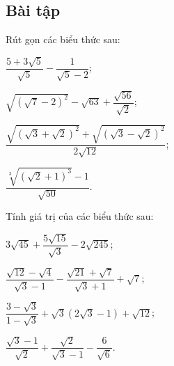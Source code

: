 \begin{exercises}
    \subsection{Bài tập}

    \begin{questions}[resume=SGK]
        \item Rút gọn các biểu thức sau:
        \begin{questions}
            \item $\dfrac{5+3\sqrt{5}}{\sqrt{5}}-\dfrac{1}{\sqrt{5}-2}$;

            \answerline
            \answerline

            \item $\sqrt{(\sqrt{7}-2)^2}-\sqrt{63}+\dfrac{\sqrt{56}}{\sqrt{2}}$;

            \answerline
            \answerline

            \item $\dfrac{\sqrt{(\sqrt{3}+\sqrt{2})^2}+\sqrt{(\sqrt{3}-\sqrt{2})^2}}{2\sqrt{12}}$;

            \answerline
            \answerline

            \item $\dfrac{\sqrt[3]{(\sqrt{2}+1)^3}-1}{\sqrt{50}}$.

            \answerline
            \answerline
        \end{questions}

        \item Tính giá trị của các biểu thức sau:
        \begin{questions}
            \item $3\sqrt{45}+\dfrac{5\sqrt{15}}{\sqrt{3}}-2\sqrt{245}$;

            \answerline
            \answerline

            \item $\dfrac{\sqrt{12}-\sqrt{4}}{\sqrt{3}-1}-\dfrac{\sqrt{21}+\sqrt{7}}{\sqrt{3}+1}+\sqrt{7}$;

            \answerline
            \answerline

            \item $\dfrac{3-\sqrt{3}}{1-\sqrt{3}}+\sqrt{3}(2\sqrt{3}-1)+\sqrt{12}$;

            \answerline
            \answerline

            \item $\dfrac{\sqrt{3}-1}{\sqrt{2}}+\dfrac{\sqrt{2}}{\sqrt{3}-1}-\dfrac{6}{\sqrt{6}}$.


\end{questions}
\end{questions}
\end{exercises}
